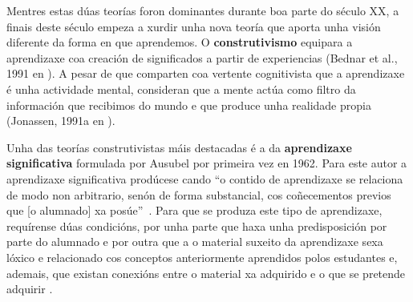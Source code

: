 Mentres estas dúas teorías foron dominantes durante boa parte do século XX, a finais deste século empeza a xurdir unha nova teoría que aporta unha visión diferente da forma en que aprendemos. O \textbf{construtivismo} equipara a aprendizaxe coa creación de significados a partir de experiencias (Bednar et al., 1991 en ). A pesar de que comparten coa vertente cognitivista que a aprendizaxe é unha actividade mental, consideran que a mente actúa como filtro da información que recibimos do mundo e que produce unha realidade propia (Jonassen, 1991a en ).

Unha das teorías construtivistas máis destacadas é a da \textbf{aprendizaxe significativa} formulada por Ausubel por primeira vez en 1962. Para este autor a aprendizaxe significativa prodúcese cando ``o contido de aprendizaxe se relaciona de modo non arbitrario, senón de forma substancial, cos coñecementos previos que [o alumnado] xa posúe''~\cite[p.~206]{unedpsicoedu}. Para que se produza este tipo de aprendizaxe, requírense dúas condicións, por unha parte que haxa unha predisposición por parte do alumnado e por outra que a o material suxeito da aprendizaxe sexa lóxico e relacionado cos conceptos anteriormente aprendidos polos estudantes e, ademais, que existan conexións entre o material xa adquirido e o que se pretende adquirir \cite{rodriguez2004teoria}.
